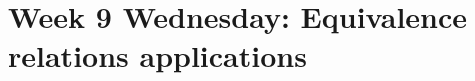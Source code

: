 \section*{Week 9 Wednesday: Equivalence relations applications}



\vfill

\vfill
\newpage



\newpage


\vfill
\newpage



